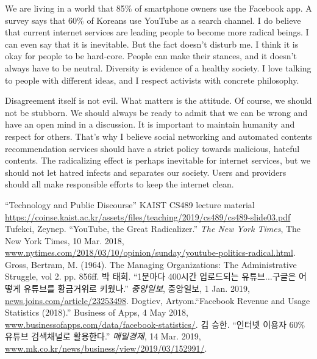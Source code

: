 \documentclass[10pt,a4paper]{article}
\begin{document}
	We are living in a world that 85\% of smartphone owners use the Facebook app\cite{facebook}. A survey says that 60\% of Koreans use YouTube as a search channel\cite{youtube}. I do believe that current internet services are leading people to become more radical beings. I can even say that it is inevitable. But the fact doesn't disturb me. I think it is okay for people to be hard-core. People can make their stances, and it doesn't always have to be neutral. Diversity is evidence of a healthy society. I love talking to people with different ideas, and I respect activists with concrete philosophy.
	
	Disagreement itself is not evil. What matters is the attitude. Of course, we should not be stubborn. We should always be ready to admit that we can be wrong and have an open mind in a discussion. It is important to maintain humanity and respect for others. That's why I believe social networking and automated contents recommendation services should have a strict policy towards malicious, hateful contents. The radicalizing effect is perhaps inevitable for internet services, but we should not let hatred infects and separates our society. Users and providers should all make responsible efforts to keep the internet clean.
	
	\newpage
	
	\begin{thebibliography}{9}
		``Technology and Public Discourse'' KAIST CS489 lecture material \url{https://coinse.kaist.ac.kr/assets/files/teaching/2019/cs489/cs489-slide03.pdf}
		Tufekci, Zeynep. “YouTube, the Great Radicalizer.” \textit{The New York Times}, The New York Times, 10 Mar. 2018, \url{www.nytimes.com/2018/03/10/opinion/sunday/youtube-politics-radical.html}.
		Gross, Bertram, M. (1964). The Managing Organizations: The Administrative Struggle, vol 2. pp. 856ff.
		박 태희. “1분마다 400시간 업로드되는 유튜브...구글은 어떻게 유튜브를 황금거위로 키웠나.” \textit{중앙일보}, 중앙일보, 1 Jan. 2019, \url{news.joins.com/article/23253498}.
		Dogtiev, Artyom.“Facebook Revenue and Usage Statistics (2018).” Business of Apps, 4 May 2018, \url{www.businessofapps.com/data/facebook-statistics/}.
		김 승한. “인터넷 이용자 60\% 유튜브 검색채널로 활용한다.” \textit{매일경제}, 14 Mar. 2019, \url{www.mk.co.kr/news/business/view/2019/03/152991/}.
		
	\end{thebibliography}
\end{document}
